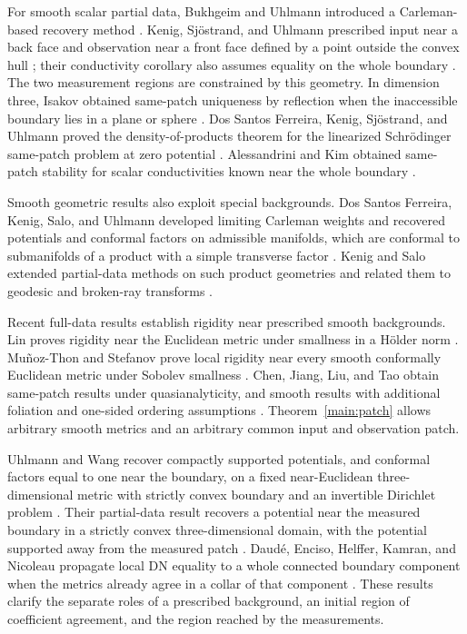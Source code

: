 For smooth scalar partial data, Bukhgeim and Uhlmann introduced a
Carleman-based recovery method \cite{BukhgeimUhlmann2002}. Kenig,
Sj\"ostrand, and Uhlmann prescribed input near a back face and
observation near a front face defined by a point outside the convex hull
\cite[Theorem~1.1]{KenigSjostrandUhlmann2007}; their conductivity
corollary also assumes equality on the whole boundary
\cite[Corollary~1.4]{KenigSjostrandUhlmann2007}. The two
measurement regions are constrained by this geometry. In dimension three,
Isakov obtained same-patch uniqueness by reflection when the inaccessible boundary lies in a plane
or sphere \cite{Isakov2007}. Dos Santos Ferreira, Kenig, Sj\"ostrand,
and Uhlmann proved the density-of-products theorem for the linearized
Schr\"odinger same-patch problem at zero potential
\cite[Theorem~1.1]{DosSantosFerreiraEtAl2009}. Alessandrini and Kim obtained
same-patch stability for scalar conductivities known near the whole
boundary \cite{AlessandriniKim2012}.

Smooth geometric results also exploit special backgrounds.
Dos Santos Ferreira, Kenig, Salo, and Uhlmann developed limiting
Carleman weights and recovered potentials and conformal factors on
admissible manifolds, which are conformal to submanifolds of a product
with a simple transverse factor \cite{DSFKSU2009}. Kenig and Salo
extended partial-data methods on such product geometries and related
them to geodesic and broken-ray transforms \cite{KenigSalo2013}.

Recent full-data results establish rigidity near prescribed smooth
backgrounds. Lin proves rigidity near the Euclidean metric under
smallness in a H\"older norm \cite[Theorem~1.1]{Lin2026}.
Mu\~noz-Thon and Stefanov prove local rigidity near every smooth
conformally Euclidean metric under Sobolev smallness
\cite[Theorem~2]{Stefanov2026}. Chen, Jiang, Liu, and Tao obtain
same-patch results under quasianalyticity, and smooth results with
additional foliation and one-sided ordering assumptions
\cite[Corollary~1.2, Theorem~1.6 and Corollary~1.7]{ChenJiangLiuTao2026}.
Theorem~\ref{main:patch} allows arbitrary smooth metrics and an
arbitrary common input and observation patch.

Uhlmann and Wang recover compactly supported potentials, and conformal
factors equal to one near the boundary, on a fixed near-Euclidean
three-dimensional metric with strictly convex boundary and an invertible
Dirichlet problem \cite{UhlmannWangNear2026}. Their partial-data result
recovers a potential near the measured boundary in a strictly convex
three-dimensional domain, with the potential supported away from the
measured patch \cite{UhlmannWangPartial2026}.
Daud\'e, Enciso, Helffer, Kamran, and Nicoleau propagate local DN
equality to a whole connected boundary component when the metrics
already agree in a collar of that component
\cite{DaudeEtAlPropagation2026}. These results clarify the separate
roles of a prescribed background, an initial region of coefficient
agreement, and the region reached by the measurements.

